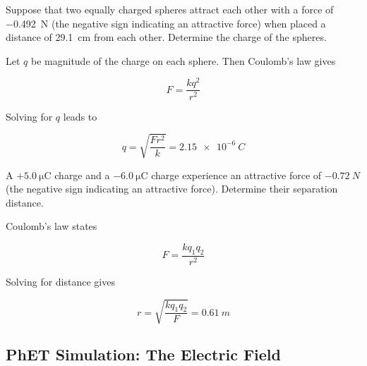 \documentclass[answers]{exam}
\begin{document}
\begin{questions}
\question
Suppose that two equally charged spheres attract each other with a force of \SI{-0.492}{N} (the negative sign indicating an attractive force) when placed a distance of \SI{29.1}{cm} from each other. Determine the charge of the spheres. 

\begin{solution}
Let $q$ be magnitude of the charge on each sphere. Then Coulomb's law gives

\begin{equation*}
    F = \frac{kq^2}{r^2}
\end{equation*}

Solving for $q$ leads to 

\begin{equation*}
    q = \sqrt{\frac{Fr^2}{k}} = \boxed{\SI{2.15e-6}{C}}
\end{equation*}
\end{solution}

\question
A $+\SI{5.0}{\micro\coulomb}$ charge and a $-\SI{6.0}{\micro\coulomb}$ charge experience an attractive force of $-\SI{0.72}{N}$ (the negative sign indicating an attractive force). Determine their separation distance.

\begin{solution}
Coulomb's law states

\begin{equation*}
    F = \frac{kq_1q_2}{r^2}
\end{equation*}

Solving for distance gives

\begin{equation*}
    r = \sqrt{\frac{kq_1q_2}{F}} = \boxed{\SI{0.61}{m}}
\end{equation*}
\end{solution}
\end{questions}

\clearpage

\subsection*{PhET Simulation: The Electric Field}
\end{document}
